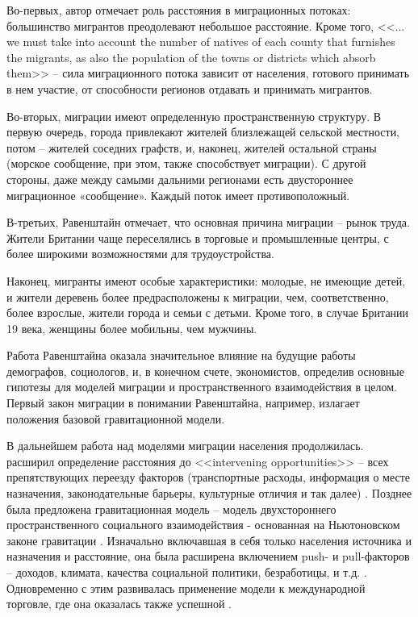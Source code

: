 \documentclass[a4paper,12pt]{article}
\begin{document}
Во-первых, автор отмечает роль расстояния в миграционных потоках: большинство мигрантов преодолевают небольшое расстояние. Кроме того, <<... we must take into account the number of natives of each county that furnishes the migrants, as also the population of the towns or districts which absorb them>> -- 
сила миграционного потока зависит от населения, готового принимать в нем участие, от способности регионов отдавать и принимать мигрантов.

Во-вторых, миграции имеют определенную пространственную структуру. В первую очередь, города привлекают жителей близлежащей сельской местности, потом – жителей соседних графств, и, наконец, жителей остальной страны (морское сообщение, при этом, также способствует миграции). С другой стороны, даже между самыми дальними регионами есть двустороннее миграционное «сообщение». Каждый поток имеет противоположный.

В-третьих, Равенштайн отмечает, что основная причина миграции – рынок труда. Жители Британии чаще переселялись в торговые и промышленные центры, с более широкими возможностями для трудоустройства.

Наконец, мигранты имеют особые характеристики: молодые, не имеющие детей, и жители деревень более предрасположены к миграции, чем, соответственно, более взрослые, жители города и семьи с детьми. Кроме того, в случае Британии 19 века, женщины более мобильны, чем мужчины. 

Работа Равенштайна оказала значительное влияние на будущие работы демографов, социологов, и, в конечном счете, экономистов, определив основные гипотезы для моделей миграции и пространственного взаимодействия в целом. Первый закон миграции в понимании Равенштайна, например, излагает положения базовой гравитационной модели.

В дальнейшем работа над моделями миграции населения продолжилась. \citeauthor{stouffer_intervening_1940} расширил определение расстояния до <<intervening opportunities>> -- всех препятствующих переезду факторов (транспортные расходы, информация о месте назначения, законодательные барьеры, культурные отличия и так далее) \citep{stouffer_intervening_1940}. Позднее была предложена гравитационная модель -- модель двухстороннего пространственного социального взаимодействия - основанная на Ньютоновском законе гравитации \citep{stewart_demographic_1948, zipf_p1_1946}. Изначально включавшая в себя только населения источника и назначения и расстояние, она была расширена включением push- и pull-факторов -- доходов, климата, качества социальной политики, безработицы, и т.д. \citep{lee_theory_1966}. 
Одновременно с этим развивалась применение модели к международной торговле, где она оказалась также успешной \citep{de_benedictis_gravity_2011}.
\end{document}
